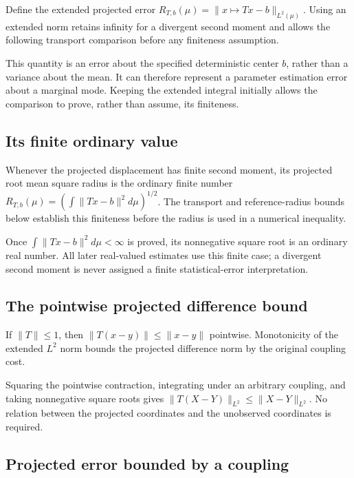 \documentclass[11pt,a4paper]{article}
\begin{document}
Define the extended projected error \(R_{T,b}(\mu)=\|x\mapsto Tx-b\|_{L^2(\mu)}\). Using an extended norm retains infinity for a divergent second moment and allows the following transport comparison before any finiteness assumption.



This quantity is an error about the specified deterministic center \(b\), rather than a variance about the mean. It can therefore represent a parameter estimation error about a marginal mode. Keeping the extended integral initially allows the comparison to prove, rather than assume, its finiteness.


\subsection{\texorpdfstring{Its finite ordinary value}{Its finite ordinary value}}


Whenever the projected displacement has finite second moment, its projected root mean square radius is the ordinary finite number \(R_{T,b}(\mu)=(\int\|Tx-b\|^2d\mu)^{1/2}\). The transport and reference-radius bounds below establish this finiteness before the radius is used in a numerical inequality.



Once \(\int\|Tx-b\|^2d\mu<\infty\) is proved, its nonnegative square root is an ordinary real number. All later real-valued estimates use this finite case; a divergent second moment is never assigned a finite statistical-error interpretation.


\subsection{\texorpdfstring{The pointwise projected difference bound}{The pointwise projected difference bound}}


If \(\|T\|\le1\), then \(\|T(x-y)\|\le\|x-y\|\) pointwise. Monotonicity of the extended \(L^2\) norm bounds the projected difference norm by the original coupling cost.



Squaring the pointwise contraction, integrating under an arbitrary coupling, and taking nonnegative square roots gives \(\|T(X-Y)\|_{L^2}\le\|X-Y\|_{L^2}\). No relation between the projected coordinates and the unobserved coordinates is required.


\subsection{\texorpdfstring{Projected error bounded by a coupling}{Projected error bounded by a coupling}}
\end{document}
